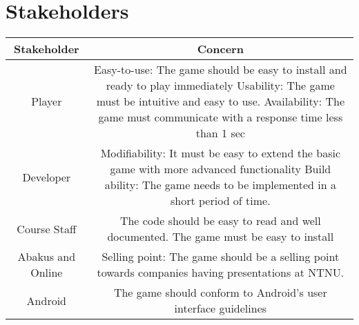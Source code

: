 \section{Stakeholders} 
\label{sec:stakeholders}

\begin{tabular}{|c|c|}
\hline
Stakeholder & Concern \\ \hline
Player & Easy-to-use: The game should be easy to install and ready to play immediately \newline
Usability: The game must be intuitive and easy to use. \newline
Availability: The game must communicate with a response time less than 1 sec\\ \hline 
Developer & Modifiability: It must be easy to extend the basic game with more advanced functionality \newline
Build ability: The game needs to be implemented in a short period of time.\\ \hline
Course Staff & The code should be easy to read and well documented. The game must be easy to install \\ \hline
Abakus and Online & Selling point: The game should be a selling point towards companies having presentations at NTNU. \\ \hline
Android & The game should conform to Android's user interface guidelines \cite{website:Android} %
\end{tabular}

